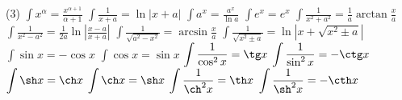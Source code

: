 \documentclass[a4paper,12pt]{article}
\newcommand{\ds}{\displaystyle}
\newcommand{\al}{\alpha} %
\newcommand{\Ln}{\ln} %
\newcommand{\lln}[1]{\Ln\left|#1\right|} %
\newcommand{\dx}{\mathop{d\!}x} %
\newcommand{\Dx}{\dx}
\newcommand{\pc}{+C}
\newcommand{\ColCount}{2}
\renewcommand{\ColCount}{3}
\renewcommand{\Dx}{1}
\renewcommand{\dx}{}
\renewcommand{\pc}{}
\begin{document}
  \begin{tasks}[style=enumerate](\ColCount)
    \task $\ds \int x^\al \dx = \frac{x^{\al+1}}{\al+1} \pc$
    \task $\ds \int \frac{\Dx}{x+a} = \lln{x+a} \pc$
    \task $\ds \int a^x \dx = \frac{a^x}{\Ln a} \pc$
    \task $\ds \int e^x \dx = e^x \pc$
    \task $\ds \int \frac{\Dx}{x^2 + a^2} = \frac{1}{a}\arctan{\frac{x}{a}} \pc$
    \task $\ds \int \frac{\Dx}{x^2 - a^2} = \frac{1}{2a}\lln{\frac{x-a}{x+a}} \pc$
    \task $\ds \int \frac{\Dx}{\sqrt{a^2 - x^2}} = \arcsin{\frac{x}{a}} \pc$
    \task $\ds \int \frac{\Dx}{\sqrt{x^2 \pm a}} = \lln{x+\sqrt{x^2 \pm a}} \pc$
    \task $\ds \int \sin x \dx = -\cos x \pc$
    \task $\ds \int \cos x \dx = \sin x \pc$
    \task $\ds \int \frac{\Dx}{\cos^2 x} \dx = \tg x \pc$
    \task $\ds \int \frac{\Dx}{\sin^2 x} \dx = -\ctg x \pc$
    \task $\ds \int \sh x \dx = \ch x \pc$
    \task $\ds \int \ch x \dx = \sh x \pc$
    \task $\ds \int \frac{\Dx}{\ch^2 x} \dx = \th x \pc$
    \task $\ds \int \frac{\Dx}{\sh^2 x} \dx = -\cth x \pc$
  \end{tasks}
\end{document}
